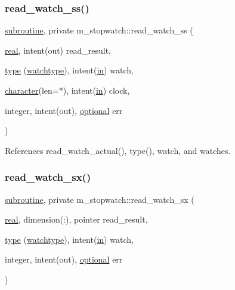 \subsubsection{\texorpdfstring{read\+\_\+watch\+\_\+ss()}{read\_watch\_ss()}}
{\footnotesize\ttfamily \hyperlink{M__stopwatch_83_8txt_acfbcff50169d691ff02d4a123ed70482}{subroutine}, private m\+\_\+stopwatch\+::read\+\_\+watch\+\_\+ss (\begin{DoxyParamCaption}\item[{\hyperlink{read__watch_83_8txt_abdb62bde002f38ef75f810d3a905a823}{real}, intent(out)}]{read\+\_\+result,  }\item[{\hyperlink{stop__watch_83_8txt_a70f0ead91c32e25323c03265aa302c1c}{type} (\hyperlink{structm__stopwatch_1_1watchtype}{watchtype}), intent(\hyperlink{M__journal_83_8txt_afce72651d1eed785a2132bee863b2f38}{in})}]{watch,  }\item[{\hyperlink{option__stopwatch_83_8txt_abd4b21fbbd175834027b5224bfe97e66}{character}(len=$\ast$), intent(\hyperlink{M__journal_83_8txt_afce72651d1eed785a2132bee863b2f38}{in})}]{clock,  }\item[{integer, intent(out), \hyperlink{option__stopwatch_83_8txt_aa4ece75e7acf58a4843f70fe18c3ade5}{optional}}]{err }\end{DoxyParamCaption})\hspace{0.3cm}{\ttfamily [private]}}



References read\+\_\+watch\+\_\+actual(), type(), watch, and watches.

\mbox{\label{namespacem__stopwatch_ae67f8aee930e9258b83b5a551120e4bd}} 
\subsubsection{\texorpdfstring{read\+\_\+watch\+\_\+sx()}{read\_watch\_sx()}}
{\footnotesize\ttfamily \hyperlink{M__stopwatch_83_8txt_acfbcff50169d691ff02d4a123ed70482}{subroutine}, private m\+\_\+stopwatch\+::read\+\_\+watch\+\_\+sx (\begin{DoxyParamCaption}\item[{\hyperlink{read__watch_83_8txt_abdb62bde002f38ef75f810d3a905a823}{real}, dimension(\+:), pointer}]{read\+\_\+result,  }\item[{\hyperlink{stop__watch_83_8txt_a70f0ead91c32e25323c03265aa302c1c}{type} (\hyperlink{structm__stopwatch_1_1watchtype}{watchtype}), intent(\hyperlink{M__journal_83_8txt_afce72651d1eed785a2132bee863b2f38}{in})}]{watch,  }\item[{integer, intent(out), \hyperlink{option__stopwatch_83_8txt_aa4ece75e7acf58a4843f70fe18c3ade5}{optional}}]{err }\end{DoxyParamCaption})\hspace{0.3cm}{\ttfamily [private]}}



